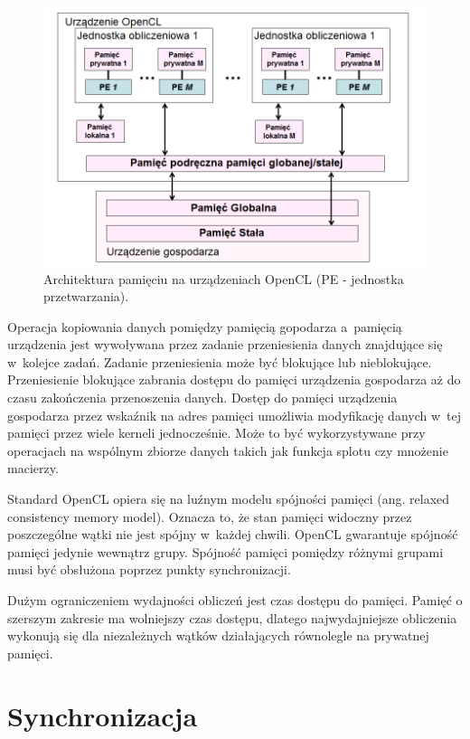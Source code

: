 \begin{figure}[H]
        \centering
                \centering
                \includegraphics[width=12cm]{architekturapamieci}
	\caption{Architektura pamięciu na urządzeniach OpenCL (PE - jednostka przetwarzania).}
\end{figure}

Operacja kopiowania danych pomiędzy pamięcią gopodarza a~pamięcią urządzenia jest wywoływana przez zadanie przeniesienia danych znajdujące się w~kolejce zadań. Zadanie przeniesienia może być blokujące lub nieblokujące. Przeniesienie blokujące zabrania dostępu do pamięci urządzenia gospodarza aż do czasu zakończenia przenoszenia danych. Dostęp do pamięci urządzenia gospodarza przez wskaźnik na adres pamięci umożliwia modyfikację danych w~tej pamięci przez wiele kerneli jednocześnie. Może to być wykorzystywane przy operacjach na wspólnym zbiorze danych takich jak funkcja splotu czy mnożenie macierzy.

Standard OpenCL opiera się na luźnym modelu spójności pamięci (ang. relaxed consistency memory model). Oznacza to, że stan pamięci widoczny przez poszczególne wątki nie jest spójny w~każdej chwili. OpenCL gwarantuje spójność pamięci jedynie wewnątrz grupy. Spójność pamięci pomiędzy różnymi grupami musi być obsłużona poprzez punkty synchronizacji.

Dużym ograniczeniem wydajności obliczeń jest czas dostępu do pamięci. Pamięć o szerszym zakresie ma wolniejszy czas dostępu, dlatego najwydajniejsze obliczenia wykonują się dla niezależnych wątków działających równolegle na prywatnej pamięci.


\section{Synchronizacja}\label{sec:OpenC61L}

